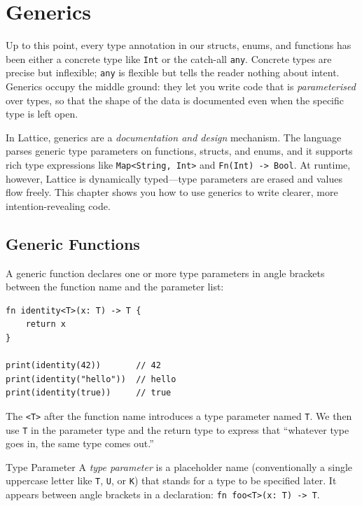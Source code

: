 \chapter{Generics}\label{ch:generics}

Up to this point, every type annotation in our structs, enums, and functions
has been either a concrete type like \lstinline|Int| or the catch-all
\lstinline|any|. Concrete types are precise but inflexible; \lstinline|any|
is flexible but tells the reader nothing about intent. Generics occupy
the middle ground: they let you write code that is \emph{parameterised}
over types, so that the shape of the data is documented even when the
specific type is left open.

In Lattice, generics are a \emph{documentation and design} mechanism.
The language parses generic type parameters on functions, structs, and
enums, and it supports rich type expressions like \lstinline|Map<String, Int>|
and \lstinline|Fn(Int) -> Bool|. At runtime, however, Lattice is
dynamically typed---type parameters are erased and values flow freely.
This chapter shows you how to use generics to write clearer, more
intention-revealing code.

\section{Generic Functions}\label{sec:generics-functions}

A generic function declares one or more type parameters in angle brackets
between the function name and the parameter list:

\begin{lstlisting}[language=Lattice, caption={A generic identity function}]
fn identity<T>(x: T) -> T {
    return x
}

print(identity(42))       // 42
print(identity("hello"))  // hello
print(identity(true))     // true
\end{lstlisting}

The \lstinline|<T>| after the function name introduces a type parameter
named \lstinline|T|. We then use \lstinline|T| in the parameter type and
the return type to express that ``whatever type goes in, the same type comes
out.''

\begin{defnbox}{Type Parameter}
A \emph{type parameter} is a placeholder name (conventionally a single
uppercase letter like \lstinline|T|, \lstinline|U|, or \lstinline|K|)
that stands for a type to be specified later. It appears between angle
brackets in a declaration: \lstinline|fn foo<T>(x: T) -> T|.
\end{defnbox}

